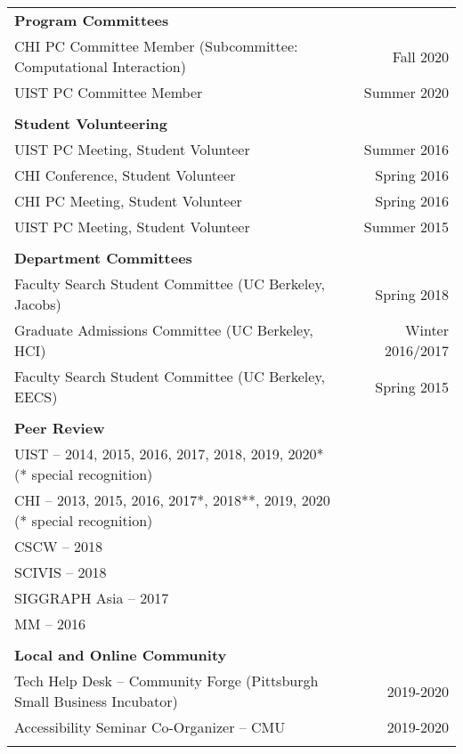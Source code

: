 \begin{longtable}{Xr}
	\textbf{Program Committees} &  \\
	CHI PC Committee Member (Subcommittee: Computational Interaction) & Fall 2020 \\
	UIST PC Committee Member & Summer 2020 \\
	\\

	\textbf{Student Volunteering} &  \\
	UIST PC Meeting, Student Volunteer & Summer 2016 \\
	CHI Conference, Student Volunteer & Spring 2016 \\
	CHI PC Meeting, Student Volunteer & Spring 2016 \\
	UIST PC Meeting, Student Volunteer & Summer 2015 \\
	\\

	\textbf{Department Committees} &  \\
	Faculty Search Student Committee (UC Berkeley, Jacobs) & Spring 2018 \\
	Graduate Admissions Committee (UC Berkeley, HCI) & Winter 2016/2017 \\
	Faculty Search Student Committee (UC Berkeley, EECS) & Spring 2015 \\
	\\

	\textbf{Peer Review} &  \\
	UIST -- 2014, 2015, 2016, 2017, 2018, 2019, 2020* (* special recognition) &  \\
	CHI -- 2013, 2015, 2016, 2017*, 2018**, 2019, 2020 (* special recognition) &  \\
	CSCW -- 2018 &  \\
	SCIVIS -- 2018 &  \\
	SIGGRAPH Asia -- 2017 &  \\
	MM -- 2016 &  \\
	\\

	\textbf{Local and Online Community} &  \\
	Tech Help Desk -- Community Forge (Pittsburgh Small Business Incubator) & 2019-2020 \\
	Accessibility Seminar Co-Organizer -- CMU & 2019-2020 \\
	\\

\end{longtable}